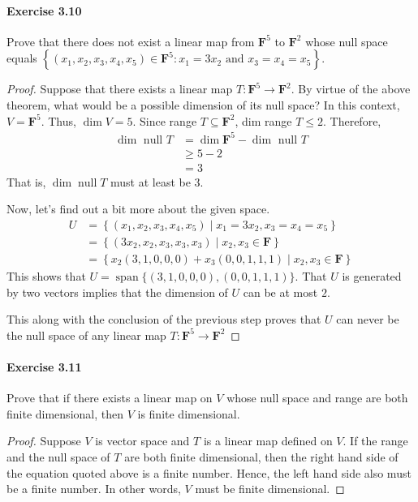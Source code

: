 \documentclass{article}
\theoremstyle{definition}
\begin{document}
\paragraph{Exercise 3.10} Prove that there does not exist a linear map from $\mathbf{F}^{5}$ to $\mathbf{F}^{2}$ whose null space equals $\left\{\left(x_{1}, x_{2}, x_{3}, x_{4}, x_{5}\right) \in \mathbf{F}^{5}: x_{1}=3 x_{2} \text { and } x_{3}=x_{4}=x_{5}\right\} .$
\begin{proof}
    Suppose that there exists a linear map $T: \mathbf{F}^5 \rightarrow \mathbf{F}^2$.
By virtue of the above theorem, what would be a possible dimension of its null space?
In this context, $V=\mathbf{F}^5$. Thus, $\operatorname{dim} V=5$.
Since range $T \subseteq \mathbf{F}^2$, dim range $T \leq 2$. Therefore,
$$
\begin{aligned}
\operatorname{dim} \text { null } T & =\operatorname{dim} \mathbf{F}^5-\operatorname{dim} \text { null } T \\
& \geq 5-2 \\
& =3
\end{aligned}
$$
That is, $ \operatorname{dim}\operatorname{null} T$ must at least be 3. 

Now, let's find out a bit more about the given space.
$$
\begin{aligned}
U & =\left\{\left(x_1, x_2, x_3, x_4, x_5\right) \mid x_1=3 x_2, x_3=x_4=x_5\right\} \\
& =\left\{\left(3 x_2, x_2, x_3, x_3, x_3\right) \mid x_2, x_3 \in \mathbf{F}\right\} \\
& =\left\{x_2(3,1,0,0,0)+x_3(0,0,1,1,1) \mid x_2, x_3 \in \mathbf{F}\right\}
\end{aligned}
$$
This shows that $U=\operatorname{span}\{(3,1,0,0,0),(0,0,1,1,1)\}$. That $U$ is generated by two vectors implies that the dimension of $U$ can be at most $2$.

This along with the conclusion of the previous step proves that $U$ can never be the null space of any linear map $T: \mathbf{F}^5 \rightarrow \mathbf{F}^2$
\end{proof}



\paragraph{Exercise 3.11} Prove that if there exists a linear map on $V$ whose null space and range are both finite dimensional, then $V$ is finite dimensional.
\begin{proof}
    Suppose $V$ is vector space and $T$ is a linear map defined on $V$. If the range and the null space of $T$ are both finite dimensional, then the right hand side of the equation quoted above is a finite number.
Hence, the left hand side also must be a finite number. In other words, $V$ must be finite dimensional.
\end{proof}
\end{document}
